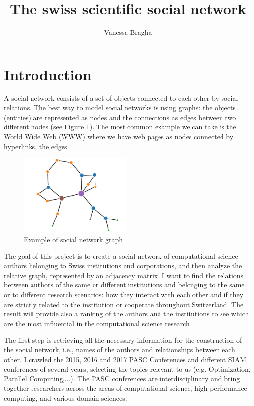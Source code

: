 \documentclass[]{usiinfbachelorproject}
\author{Vanessa Braglia}
\title{The swiss scientific social network}
\begin{document}
\newpage
\tableofcontents
\newpage

\section{Introduction} \label{sec:intro} 

A social network consists of a set of objects connected to each other by social relations. The best way to model social networks is using graphs: the objects (entities) are represented as nodes and the connections as edges between two different nodes (see Figure \ref{fig:socialnetwork}). The most common example we can take is the World Wide Web (WWW) where we have web pages as nodes connected by hyperlinks, the edges.

\begin{figure}[ht]
	\centering
	\includegraphics[height=4cm]{img/graph2.png}
	\caption{Example of social network graph}
	\label{fig:socialnetwork}
\end{figure}

The goal of this project is to create a social network of computational science authors belonging to Swiss institutions and corporations, and then analyze the relative graph, represented by an adjacency matrix. I want to find the relations between authors of the same or different institutions and belonging to the same or to different research scenarios: how they interact with each other and if they are strictly related to the institution or cooperate throughout Switzerland. The result will provide also a ranking of the authors and the institutions to see which are the most influential in the computational science research.

The first step is retrieving all the necessary information for the construction of the social network, i.e., names of the authors and relationships between each other. I crawled the 2015, 2016 and 2017 PASC Conferences and different SIAM conferences of several years, selecting the topics relevant to us (e.g. Optimization, Parallel Computing,...). The PASC conferences are interdisciplinary and bring together researchers across the areas of computational science, high-performance computing, and various domain sciences.
\end{document}
